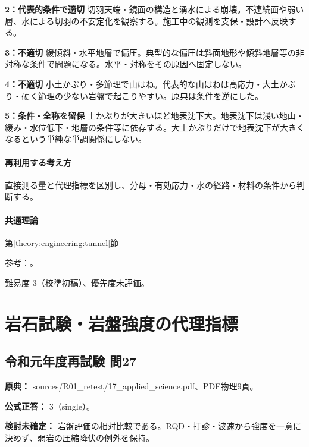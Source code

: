 \noindent\textbf{2：代表的条件で適切} 切羽天端・鏡面の構造と湧水による崩壊。不連続面や弱い層、水による切羽の不安定化を観察する。施工中の観測を支保・設計へ反映する。\par

\noindent\textbf{3：不適切} 緩傾斜・水平地層で偏圧。典型的な偏圧は斜面地形や傾斜地層等の非対称な条件で問題になる。水平・対称をその原因へ固定しない。\par

\noindent\textbf{4：不適切} 小土かぶり・多節理で山はね。代表的な山はねは高応力・大土かぶり・硬く節理の少ない岩盤で起こりやすい。原典は条件を逆にした。\par

\noindent\textbf{5：条件・全称を留保} 土かぶりが大きいほど地表沈下大。地表沈下は浅い地山・緩み・水位低下・地層の条件等に依存する。大土かぶりだけで地表沈下が大きくなるという単純な単調関係にしない。\par

\paragraph{再利用する考え方} 直接測る量と代理指標を区別し、分母・有効応力・水の経路・材料の条件から判断する。

\paragraph{共通理論} \hyperref[theory:engineering:tunnel]{第\ref*{theory:engineering:tunnel}節}

\par 参考：\cite{eng52_tunnel_ref,eng52_rockburst}。

\par 難易度 3（校準初稿）、優先度未評価。

\section{岩石試験・岩盤強度の代理指標}

\subsection{令和元年度再試験 問27}
\label{q:r01-ret-applied-27}

\noindent\textbf{原典：} sources/R01\_retest/17\_applied\_science.pdf、PDF物理9頁。

\textbf{公式正答：} 3（single）。

\par\textbf{検討未確定：} 岩盤評価の相対比較である。RQD・打診・波速から強度を一意に決めず、弱岩の圧縮降伏の例外を保持。

